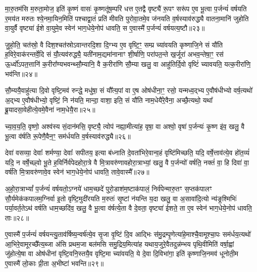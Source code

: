 {\anuvakamend[{य॒न्ति॒ दे॒वा विꣳ॑शति॒श्च॑॥८॥}]}

मा॒रु॒तम॑सि म॒रुता॒मोज॒ इति॑ कृ॒ष्णं वासः॑ कृ॒ष्णतू॑ष॒म्परि॑ धत्त ए॒तद्वै वृष्ट्यै॑ रू॒पꣳ सरू॑प ए॒व भू॒त्वा प॒र्जन्यं॑ वर्\mbox{}षयति र॒मय॑त मरुतः श्ये॒नमा॒यिन॒मिति॑ पश्चाद्वा॒तं प्रति॑ मीवति पुरोवा॒तमे॒व ज॑नयति व॒र्\mbox{}षस्याव॑रुद्ध्यै वातना॒मानि॑ जुहोति वा॒युर्वै वृष्ट्या॑ ईशे वा॒युमे॒व स्वेन॑ भाग॒धेये॒नोप॑ धावति॒ स ए॒वास्मै॑ प॒र्जन्यं॑ वर्\mbox{}षयत्य॒ष्टौ॥२३॥

जु॒हो॒ति॒ चत॑स्रो॒ वै दिश॒श्चत॑स्रो\-ऽवान्तरदि॒शा दि॒ग्भ्य ए॒व वृष्टि॒ꣳ॒ सम्प्र च्या॑वयति कृष्णाजि॒ने सं यौ॑ति ह॒विरे॒वाक॑रन्तर्वे॒दि सं यौ॒त्यव॑रुद्ध्यै॒ यती॑नाम॒द्यमा॑नानाꣳ शी॒र्\mbox{}षाणि॒ परा॑पत॒न्ते ख॒र्जूरा॑ अभव॒न्तेषा॒ꣳ॒ रस॑ ऊ॒र्ध्वो॑\-ऽपत॒त्तानि॑ क॒रीरा᳚ण्यभवन्थ्सौ॒म्यानि॒ वै क॒रीरा॑णि सौ॒म्या खलु॒ वा आहु॑तिर्दि॒वो वृष्टिं॑ च्यावयति॒ यत्क॒रीरा॑णि॒ भव॑न्ति॥२४॥

सौ॒म्ययै॒वाहु॑त्या दि॒वो वृष्टि॒मव॑ रुन्द्धे॒ मधु॑षा॒ सं यौ᳚त्य॒पां वा ए॒ष ओष॑धीना॒ꣳ॒ रसो॒ यन्मध्व॒द्भ्य ए॒वौष॑धीभ्यो वर्\mbox{}ष॒त्यथो॑ अ॒द्भ्य ए॒वौष॑धीभ्यो॒ वृष्टिं॒ नि न॑यति॒ मान्दा॒ वाशा॒ इति॒ सं यौ॑ति नाम॒धेयै॑रे॒वैना॒ अच्छै॒त्यथो॒ यथा᳚ ब्रू॒यादसा॒वेहीत्ये॒वमे॒वैना॑ नाम॒धेयै॒रा॥२५॥

च्या॒व॒य॒ति॒ वृष्णो॒ अश्व॑स्य सं॒दान॑मसि॒ वृष्ट्यै॒ त्वोप॑ नह्या॒मीत्या॑ह॒ वृषा॒ वा अश्वो॒ वृषा॑ प॒र्जन्यः॑ कृ॒ष्ण इ॑व॒ खलु॒ वै भू॒त्वा व॑र्\mbox{}षति रू॒पेणै॒वैन॒ꣳ॒ सम॑र्धयति व॒र्\mbox{}षस्याव॑रुद्ध्यै॥२६॥

{\anuvakamend[{अ॒ष्टौ भव॑न्ति नाम॒धेयै॒रैका॒न्नत्रि॒ꣳ॒शच्च॑॥९॥}]}

देवा॑ वसव्या॒ देवाः᳚ शर्मण्या॒ देवाः᳚ सपीतय॒ इत्या ब॑ध्नाति दे॒वता॑भिरे॒वान्व॒हं वृष्टि॑मिच्छति॒ यदि॒ वर्\mbox{}षे॒त्ताव॑त्ये॒व हो॑त॒व्यं॑ यदि॒ न वर्\mbox{}षे॒च्छ्वो भू॒ते ह॒विर्निर्व॑पेदहोरा॒त्रे वै मि॒त्रावरु॑णावहोरा॒त्राभ्यां॒ खलु॒ वै प॒र्जन्यो॑ वर्\mbox{}षति॒ नक्तं॑ वा॒ हि दिवा॑ वा॒ वर्\mbox{}ष॑ति मि॒त्रावरु॑णावे॒व स्वेन॑ भाग॒धेये॒नोप॑ धावति॒ तावे॒वास्मै᳚॥२७॥

अ॒हो॒रा॒त्रा\-भ्यां᳚ प॒र्जन्यं॑ वर्\mbox{}षयतो॒\-ऽग्नये॑ धाम॒च्छदे॑ पुरो॒डाश॑म॒ष्टाक॑पालं॒ निर्व॑पेन्मारु॒तꣳ स॒प्तक॑पालꣳ सौ॒र्यमेक॑कपालम॒ग्निर्वा इ॒तो वृष्टि॒मुदी॑रयति म॒रुतः॑ सृ॒ष्टां न॑यन्ति य॒दा खलु॒ वा अ॒सावा॑दि॒त्यो न्य॑ङ्र॒श्मिभिः॑ पर्या॒वर्त॒ते\-ऽथ॑ वर्\mbox{}षति धाम॒च्छदि॑व॒ खलु॒ वै भू॒त्वा व॑र्\mbox{}षत्ये॒ता वै दे॒वता॒ वृष्ट्या॑ ईशते॒ ता ए॒व स्वेन॑ भाग॒धेये॒नोप॑ धावति॒ ताः॥२८॥

ए॒वास्मै॑ प॒र्जन्यं॑ वर्\mbox{}षयन्त्यु॒ताव॑र्\mbox{}षिष्य॒न्वर्\mbox{}ष॑त्ये॒व सृ॒जा वृ॒ष्टिं दि॒व आद्भिः स॑मु॒द्रम्पृ॒णेत्या॑हे॒माश्चै॒वामूश्चा॒पः सम॑र्धय॒त्यथो॑ आ॒भिरे॒वामूरच्छै᳚त्य॒ब्जा अ॑सि प्रथम॒जा बल॑मसि समु॒द्रिय॒मित्या॑ह यथाय॒जुरे॒वैतदुन्न॑म्भय पृथि॒वीमिति॑ वर्\mbox{}षा॒ह्वां जु॑होत्ये॒षा वा ओष॑धीनां वृष्टि॒वनि॒स्तयै॒व वृष्टि॒मा च्या॑वयति॒ ये दे॒वा दि॒विभा॑गा॒ इति॑ कृष्णाजि॒नमव॑ धूनोती॒म ए॒वास्मै॑ लो॒काः प्री॒ता अ॒भीष्टा॑ भवन्ति॥२९॥

